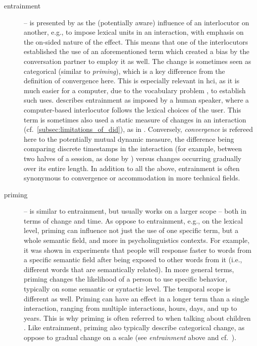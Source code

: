 \begin{description}
	\item[entrainment] -- is presented by \citet{Brennan1996lexical} as the (potentially aware) influence of an interlocutor on another, e.g., to impose lexical units in an interaction, with emphasis on the on-sided nature of the effect.
	This means that one of the interlocutors established the use of an aforementioned term which created a bias by the conversation partner to employ it as well.
	The change is sometimes seen as categorical (similar to \textit{priming}), which is a key difference from the definition of convergence here.
	This is especially relevant in \ac{hci}, as it is much easier for a computer, due to the vocabulary problem \citep{Furnas1987vocabulary}, to establish such uses.
	\citet{Lopes2013automated} describes entrainment as imposed by a human speaker, where a computer-based interlocutor follows the lexical choices of the user.
	This term is sometimes also used a static measure of changes in an interaction (cf.\ \cref{subsec:limitations_of_did}), as in \citet{Levitan2013entrainment}.
	Conversely, \emph{convergence} is refereed here to the potentially mutual dynamic measure, the difference being comparing discrete timestamps in the interaction (for example, between two halves of a session, as done by \citet{Xia2014prosodic}) versus changes occurring gradually over its entire length.
	In addition to all the above, entrainment is often synonymous to convergence or accommodation in more technical fields.
	
	\item[priming] -- is similar to entrainment, but usually works on a larger scope -- both in terms of change and time.
	As oppose to entrainment, e.g., on the lexical level, priming can influence not just the use of one specific term, but a whole semantic field, and more in psycholinguistics contexts.
	For example, it was shown in experiments \citep[e.g.,][]{Meyer1971facilitation, Schvaneveldt1973retrieval} that people will response faster to words from a specific semantic field after being exposed to other words from it (i.e., different words that are semantically related).
	In more general terms, priming changes the likelihood of a person to use specific behavior, typically on some semantic or syntactic level.
	The temporal scope is different as well.
	Priming can have an effect in a longer term than a single interaction, ranging from multiple interactions, hours, days, and up to years.
	This is why priming is often referred to when talking about children \citep[see, e.g., ][]{Huttenlocher2004syntactic, Wansink2012would}.
	Like entrainment, priming also typically describe categorical change, as oppose to gradual change on a scale (see \textit{entrainment} above and cf.\ \citet{Reitter2006computational, Pace2013concept}).
	

\end{description}
